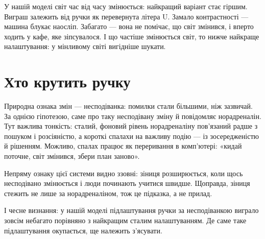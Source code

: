 У нашій моделі світ час від часу змінюється: найкращий варіант стає гіршим. Виграш залежить від ручки як перевернута літера U. Замало контрастності --- машина блукає наосліп. Забагато --- вона не помічає, що світ змінився, і вперто ходить у кафе, яке зіпсувалося. І що частіше змінюється світ, то нижче найкраще налаштування: у мінливому світі вигідніше шукати.


\section*{Хто крутить ручку}

Природна ознака змін --- несподіванка: помилки стали більшими, ніж зазвичай. За однією гіпотезою, саме про таку несподівану зміну й повідомляє норадреналін. Тут важлива тонкість: сталий, фоновий рівень норадреналіну пов'язаний радше з пошуком і розсіяністю, а короткі спалахи на важливу подію --- із зосередженістю й рішенням. Можливо, спалах працює як переривання в комп'ютері: «кидай поточне, світ змінився, збери план заново».

Непряму ознаку цієї системи видно ззовні: зіниця розширюється, коли щось несподівано змінюється і люди починають учитися швидше. Щоправда, зіниця стежить не лише за норадреналіном, тож це підказка, а не прилад.

І чесне визнання: у нашій моделі підлаштування ручки за несподіванкою виграло зовсім небагато порівняно з найкращим сталим налаштуванням. Де саме таке підлаштування окупається, ще належить з'ясувати.

